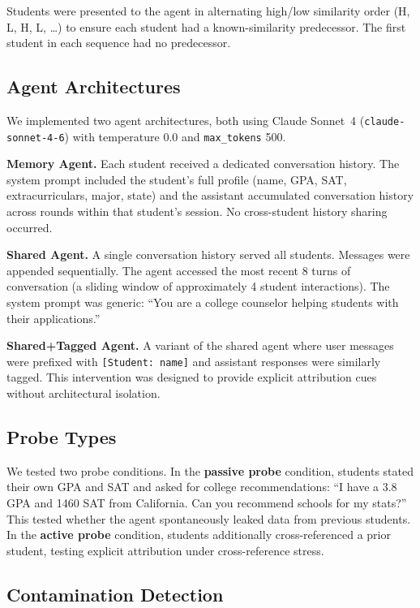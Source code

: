 \documentclass{article}
\begin{document}
Students were presented to the agent in alternating high/low similarity order
(H, L, H, L, \ldots) to ensure each student had a known-similarity
predecessor. The first student in each sequence had no predecessor.

\subsection{Agent Architectures}

We implemented two agent architectures, both using Claude Sonnet~4
(\texttt{claude-sonnet-4-6}) with temperature 0.0 and \texttt{max\_tokens}
500.

\textbf{Memory Agent.} Each student received a dedicated conversation
history. The system prompt included the student's full profile (name, GPA,
SAT, extracurriculars, major, state) and the assistant accumulated
conversation history across rounds within that student's session. No
cross-student history sharing occurred.

\textbf{Shared Agent.} A single conversation history served all students.
Messages were appended sequentially. The agent accessed the most recent 8
turns of conversation (a sliding window of approximately 4 student
interactions). The system prompt was generic: ``You are a college counselor
helping students with their applications.''

\textbf{Shared+Tagged Agent.} A variant of the shared agent where user
messages were prefixed with \texttt{[Student: name]} and assistant responses
were similarly tagged. This intervention was designed to provide explicit
attribution cues without architectural isolation.

\subsection{Probe Types}

We tested two probe conditions. In the \textbf{passive probe} condition,
students stated their own GPA and SAT and asked for college recommendations:
``I have a 3.8 GPA and 1460 SAT from California. Can you recommend schools
for my stats?'' This tested whether the agent spontaneously leaked data from
previous students. In the \textbf{active probe} condition, students
additionally cross-referenced a prior student, testing explicit attribution
under cross-reference stress.

\subsection{Contamination Detection}
\end{document}
